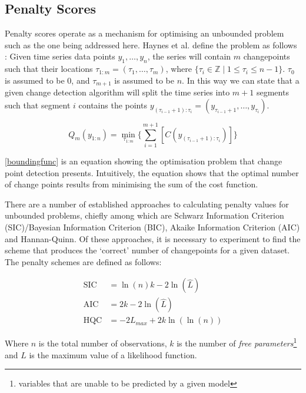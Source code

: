 \documentclass{uvamscse}	%
\begin{document}
\subsection{Penalty Scores}

Penalty scores operate as a mechanism for optimising an unbounded problem such as the one being addressed here. Haynes et al. define the problem as follows \cite{Haynes2014}: Given time series data points $y_1,\ldots,y_n$, the series will contain $m$ changepoints such that their locations $\tau_{1:m} = (\tau_1,\ldots,\tau_m)$, where $\{\tau_i \in \mathbb{Z} \mid 1 \leqslant \tau_i \leqslant n-1\}$. $\tau_0$ is assumed to be 0, and $\tau_{m+1}$ is assumed to be $n$. In this way we can state that a given change detection algorithm will split the time series into $m + 1$ segments such that segment $i$ contains the points $y_{(\tau_{i-1}+1):\tau_i} = (y_{\tau_{i-1} + 1},\dots,y_{\tau_i})$.

\begin{equation}
\label{boundingfunc}
    Q_m(y_{1:n}) = \min_{\tau_{1:m}} \Bigg\{ \sum^{m+1}_{i=1}[C(y_{(\tau_{i - 1} + 1):\tau_i})] \Bigg\}
\end{equation}

\autoref{boundingfunc} is an equation showing the optimisation problem that change point detection presents. Intuitively, the equation shows that the optimal number of change points results from minimising the sum of the cost function.

There are a number of established approaches to calculating penalty values for unbounded problems, chiefly among which are Schwarz Information Criterion (SIC)/Bayesian Information Criterion (BIC), Akaike Information Criterion (AIC) and Hannan-Quinn. Of these approaches, it is necessary to experiment to find the scheme that produces the `correct' number of changepoints for a given dataset. The penalty schemes are defined as follows:

\begin{align}
    \text{SIC} &= \ln(n) k - 2 \ln(\hat{L})\\
    \text{AIC} &= 2k - 2 \ln(\hat{L})\\
    \text{HQC} &= -2L_{max} + 2k \ln(\ln(n))
\end{align}

Where $n$ is the total number of observations, $k$ is the number of \emph{free parameters}\footnote{variables that are unable to be predicted by a given model} and $\hat{L}$ is the maximum value of a likelihood function.
\end{document}

